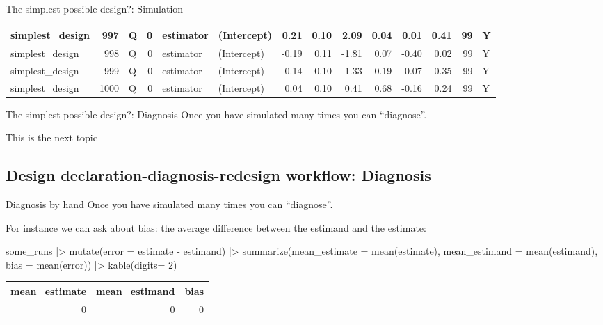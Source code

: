 \documentclass[
  11pt,
  ignorenonframetext,
]{beamer}
\newenvironment{Shaded}{\begin{snugshade}}{\end{snugshade}}
\newcommand{\AttributeTok}[1]{\textcolor[rgb]{0.40,0.45,0.13}{#1}}
\newcommand{\DecValTok}[1]{\textcolor[rgb]{0.68,0.00,0.00}{#1}}
\newcommand{\FunctionTok}[1]{\textcolor[rgb]{0.28,0.35,0.67}{#1}}
\newcommand{\NormalTok}[1]{\textcolor[rgb]{0.00,0.23,0.31}{#1}}
\newcommand{\SpecialCharTok}[1]{\textcolor[rgb]{0.37,0.37,0.37}{#1}}
\begin{document}
\begin{frame}[fragile]{The simplest possible design?: Simulation}
\begin{tabular}{l|r|l|r|l|l|r|r|r|r|r|r|r|l}
\hline
simplest\_design & 997 & Q & 0 & estimator & (Intercept) & 0.21 & 0.10 & 2.09 & 0.04 & 0.01 & 0.41 & 99 & Y\\
\hline
simplest\_design & 998 & Q & 0 & estimator & (Intercept) & -0.19 & 0.11 & -1.81 & 0.07 & -0.40 & 0.02 & 99 & Y\\
\hline
simplest\_design & 999 & Q & 0 & estimator & (Intercept) & 0.14 & 0.10 & 1.33 & 0.19 & -0.07 & 0.35 & 99 & Y\\
\hline
simplest\_design & 1000 & Q & 0 & estimator & (Intercept) & 0.04 & 0.10 & 0.41 & 0.68 & -0.16 & 0.24 & 99 & Y\\
\hline
\end{tabular}
\end{frame}

\begin{frame}{The simplest possible design?: Diagnosis}
\protect\hypertarget{the-simplest-possible-design-diagnosis}{}
Once you have simulated many times you can ``diagnose''.

This is the next topic
\end{frame}

\hypertarget{design-declaration-diagnosis-redesign-workflow-diagnosis}{%
\subsection{Design declaration-diagnosis-redesign workflow:
Diagnosis}\label{design-declaration-diagnosis-redesign-workflow-diagnosis}}

\begin{frame}[fragile]{Diagnosis by hand}
\protect\hypertarget{diagnosis-by-hand}{}
Once you have simulated many times you can ``diagnose''.

For instance we can ask about bias: the average difference between the
estimand and the estimate:

\begin{Shaded}
\begin{Highlighting}[]
\NormalTok{some\_runs }\SpecialCharTok{|\textgreater{}} \FunctionTok{mutate}\NormalTok{(}\AttributeTok{error =}\NormalTok{ estimate }\SpecialCharTok{{-}}\NormalTok{ estimand) }\SpecialCharTok{|\textgreater{}}
  \FunctionTok{summarize}\NormalTok{(}\AttributeTok{mean\_estimate =} \FunctionTok{mean}\NormalTok{(estimate), }
            \AttributeTok{mean\_estimand =} \FunctionTok{mean}\NormalTok{(estimand), }
            \AttributeTok{bias =} \FunctionTok{mean}\NormalTok{(error)) }\SpecialCharTok{|\textgreater{}}
  \FunctionTok{kable}\NormalTok{(}\AttributeTok{digits=} \DecValTok{2}\NormalTok{)}
\end{Highlighting}
\end{Shaded}

\begin{tabular}{r|r|r}
\hline
mean\_estimate & mean\_estimand & bias\\
\hline
0 & 0 & 0\\
\hline
\end{tabular}
\end{frame}
\end{document}
